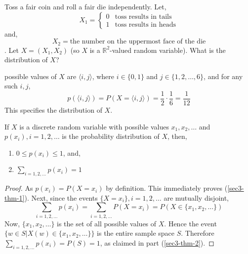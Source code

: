 \begin{example}
    Toss a fair coin and roll a fair die independently. Let,
    \begin{equation*}
        X_1 = \begin{cases}
            0 & \text{toss results in tails}                                 \\
            1 & \text{toss results in heads}
        \end{cases}
    \end{equation*}
    and, 
    \begin{equation*}
        X_2 = \text{the number on the uppermost face of the die}
    \end{equation*}.
    Let $X = (X_1, X_2)$ (so $X$ is a $\mathbb{R}^2$-valued random variable).
What is the distribution of $X$?
\end{example}
\begin{solution}
    possible values of $X$ are $\langle i, j\rangle$, where $i \in \lbrace 0, 1
\rbrace$ and $j \in \lbrace 1, 2, \dots, 6 \rbrace$, and for any such $i, j$,
\begin{equation*}
    p(\langle i,j \rangle) = P(X = \langle i,j \rangle)
                           = \frac{1}{2} \cdot \frac{1}{6}
                           = \frac{1}{12}
\end{equation*}
This specifies the distribution of $X$.
\end{solution}

\begin{theorem}
    If $X$ is a discrete random variable with possible values $x_1, x_2,
\dots$ and $p(x_i), i = 1, 2, \dots$ is the probability distribution of $X$,
then,
\begin{enumerate}[noitemsep, topsep=0em]
    \item \label{sec3-thm-1}
          $0 \leq p(x_i) \leq 1$, and,
    \item \label{sec3-thm-2}
          $\sum_{i = 1, 2, \dots} p(x_i) = 1$
\end{enumerate}
\end{theorem}
\begin{proof}
    As $p(x_i) = P(X = x_i)$ by definition. This immediately proves
(\ref{sec3-thm-1}). Next, since the events $\lbrace X = x_i \rbrace, i = 1, 2,
\dots$ are mutually disjoint,
\begin{equation*}
      \sum_{i = 1, 2, \dots} p(x_i) = \sum_{i = 1, 2, \dots} P(X = x_i)
    = P(X \in \lbrace x_1, x_2, \dots \rbrace)
\end{equation*}
    Now, $\lbrace x_1, x_2, \dots \rbrace$ is the set of all possible values of
$X$. Hence the event $\lbrace w \in S \vert X(w) \in \lbrace x_1, x_2, \dots
\rbrace \rbrace$ is the entire sample space $S$. Therefore $\sum_{i = 1, 2,
\dots} p(x_i) = P(S) = 1$, as claimed in part (\ref{sec3-thm-2}).
\end{proof}

